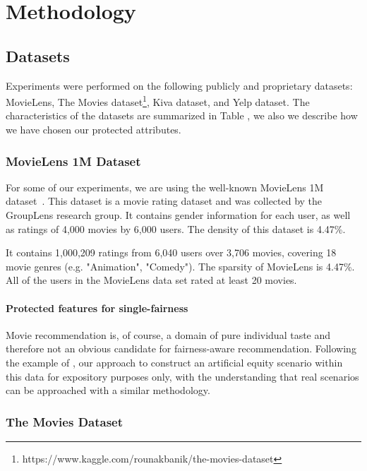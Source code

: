 \chapter{Methodology}
\label{methodology}

\section{Datasets}

Experiments were performed on the following publicly and proprietary datasets: MovieLens\cite{movielens}, The Movies dataset\footnote{https://www.kaggle.com/rounakbanik/the-movies-dataset}, Kiva dataset, and Yelp dataset. The characteristics of the datasets are summarized in Table , we also we describe how we have chosen our protected attributes. 

    \subsection{MovieLens 1M Dataset}
    For some of our experiments, we are using the well-known MovieLens 1M dataset~\cite{movielens}. This dataset is a movie rating dataset and was collected by the GroupLens research group. It contains gender information for each user, as well as ratings of 4,000 movies by 6,000 users. The density of this dataset is 4.47\%.
    
    It contains 1,000,209 ratings from 6,040 users over 3,706 movies, covering 18 movie genres (e.g. "Animation", "Comedy"). The sparsity of MovieLens is 4.47\%. All of the users in the MovieLens data set rated at least 20 movies. 

        \subsubsection{Protected features for single-fairness}
        Movie recommendation is, of course, a domain of pure individual taste and therefore not an obvious candidate for fairness-aware recommendation. 
        Following the example of \cite{yao2017beyond}, our approach to construct an artificial equity scenario within this data for expository purposes only, with the understanding that real scenarios can be approached with a similar methodology.

    \subsection{The Movies Dataset}
    
